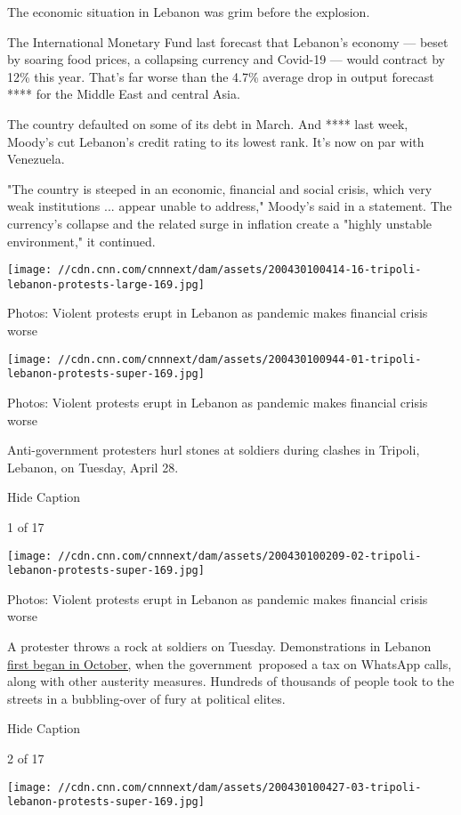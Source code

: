 The economic situation in Lebanon was grim before the explosion.

The International Monetary Fund last forecast that Lebanon's economy ---
beset by soaring food prices, a collapsing currency and Covid-19 ---
would contract by 12\% this year. That's far worse than the 4.7\%
average drop in output forecast **** for the Middle East and central
Asia.

The country defaulted on some of its debt in March. And **** last week,
Moody's cut Lebanon's credit rating to its lowest rank. It's now on par
with Venezuela.

"The country is steeped in an economic, financial and social crisis,
which very weak institutions ... appear unable to address," Moody's said
in a statement. The currency's collapse and the related surge in
inflation create a "highly unstable environment," it continued.

\texttt{[image: //cdn.cnn.com/cnnnext/dam/assets/200430100414-16-tripoli-lebanon-protests-large-169.jpg]}

Photos: Violent protests erupt in Lebanon as pandemic makes financial
crisis worse

\texttt{[image: //cdn.cnn.com/cnnnext/dam/assets/200430100944-01-tripoli-lebanon-protests-super-169.jpg]}

Photos: Violent protests erupt in Lebanon as pandemic makes financial
crisis worse

Anti-government protesters hurl stones at soldiers during clashes in
Tripoli, Lebanon, on Tuesday, April 28.

Hide Caption

1 of 17

\texttt{[image: //cdn.cnn.com/cnnnext/dam/assets/200430100209-02-tripoli-lebanon-protests-super-169.jpg]}

Photos: Violent protests erupt in Lebanon as pandemic makes financial
crisis worse

A protester throws a rock at soldiers on Tuesday. Demonstrations in
Lebanon
\href{http://www.cnn.com/2019/10/29/world/gallery/lebanon-protests-political-crisis-intl/index.html}{first
began in October,} when the government~proposed a tax on WhatsApp calls,
along with other austerity measures. Hundreds of thousands of people
took to the streets in a bubbling-over of fury at political elites.

Hide Caption

2 of 17

\texttt{[image: //cdn.cnn.com/cnnnext/dam/assets/200430100427-03-tripoli-lebanon-protests-super-169.jpg]}

